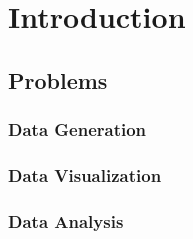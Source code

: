 
\chapter{Introduction}

\section{Problems}
\subsection{Data Generation}
\subsection{Data Visualization}
\subsection{Data Analysis}
